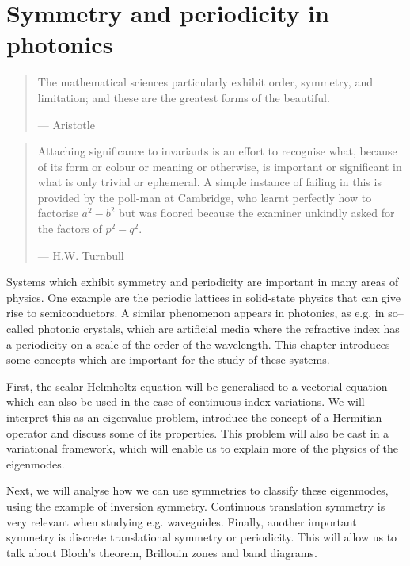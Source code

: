 \chapter{Symmetry and periodicity in photonics}
\label{h:periodic}

\begin{quote}
The mathematical sciences particularly exhibit order, symmetry, and limitation; and these are the greatest forms of the beautiful.

--- Aristotle
\end{quote}

\begin{quote}
Attaching significance to invariants is an effort to recognise what, because of its form or colour or meaning or otherwise, is important or significant in what is only trivial or ephemeral. A simple instance of failing in this is provided by the poll-man at Cambridge, who learnt perfectly how to factorise $a^2 - b^2$ but was floored because the examiner unkindly asked for the factors of $p^2 - q^2$.

--- H.W. Turnbull
\end{quote}

\chaptertoc

Systems which exhibit symmetry and periodicity are important in many areas of physics. One example are the periodic lattices in solid-state physics that can give rise to semiconductors. A similar phenomenon appears in photonics, as e.g. in so--called photonic crystals, which are artificial media where the refractive index has a periodicity on a scale of the order of the wavelength. This chapter introduces some concepts which are important for the study of these systems.

First, the scalar Helmholtz equation will be generalised to a vectorial equation which can also be used in the case of continuous index variations. We will interpret this as an eigenvalue problem, introduce the concept of a Hermitian operator and discuss some of its properties. This problem will also be cast in a variational framework, which will enable us to explain more of the physics of the eigenmodes.

Next, we will analyse how we can use symmetries to classify these eigenmodes, using the example of inversion symmetry. Continuous translation symmetry is very relevant when studying e.g. waveguides. Finally, another important symmetry is discrete translational symmetry or periodicity. This will allow us to talk about Bloch's theorem, Brillouin zones and band diagrams. 


